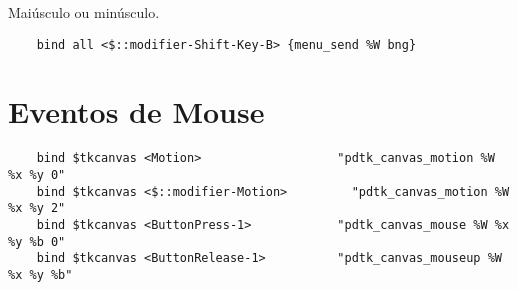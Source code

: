 Maiúsculo ou minúsculo.
\begin{lstlisting}
    bind all <$::modifier-Shift-Key-B> {menu_send %W bng}
\end{lstlisting}


\section{Eventos de Mouse}

\begin{lstlisting}
    bind $tkcanvas <Motion>                   "pdtk_canvas_motion %W %x %y 0"
    bind $tkcanvas <$::modifier-Motion>         "pdtk_canvas_motion %W %x %y 2"
    bind $tkcanvas <ButtonPress-1>            "pdtk_canvas_mouse %W %x %y %b 0"
    bind $tkcanvas <ButtonRelease-1>          "pdtk_canvas_mouseup %W %x %y %b"
\end{lstlisting}

